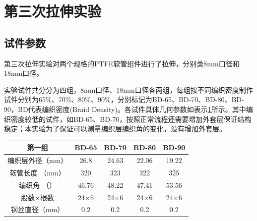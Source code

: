 \newpage
\section{第三次拉伸实验}
\subsection{试件参数}
  第三次拉伸实验对两个规格的PTFE软管组件进行了拉伸，分别类8mm口径和18mm口径。
  
  实验试件共分分为四组，8mm口径、18mm口径各两组，每组按不同编织密度制作试件分别为65\%、70\%、80\%、90\%，分别标记为BD-65、BD-70、BD-80、BD-90，BD代表编织密度(Braid Density)。各试件具体几何参数如表示\ref{tab:hose-specimen-III}所示。其中编织密度较低的试件，如BD-65、BD-70，按照正常流程还需要增加外套层保证结构稳定；本实验为了保证可以测量编织层编织角的变化，没有增加外套层。
  
  
  
  \begin{table}[!htb]
  	\centering
  	\label{tab:hose-specimen-III}
  	\begin{tabular*}{0.8\textwidth}{@{\extracolsep{\fill}}>{\hspace{0.5cm}}ccccc}
  		\toprule
  		\textbf{第一组}&     BD-65     &     BD-70     &     BD-80     &     BD-90     \\ \midrule
  		编织层外径（mm）  & 26.8         &     24.63     &     22.06     &     19.22       \\
  		软管长度 （mm）    & 320          &      323      &      322      &      325       \\
  		编织角 （\textdegree）   & 46.76 &     48.22     &     47.41     &     53.56     \\
  		股数$ \times $根数          & 24$ \times $6 & 24$ \times $6 & 24$ \times $6 & 24$ \times $6 \\
  		钢丝直径（mm）                &      0.2      &      0.2      &      0.2      &      0.2      \\ \bottomrule
  	\end{tabular*} 
  \end{table}
  
